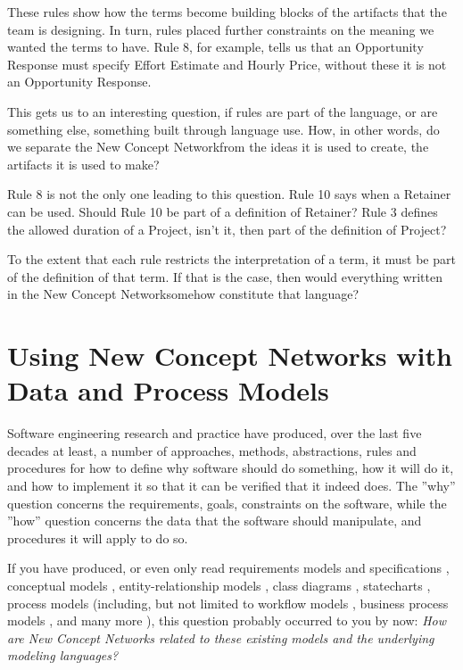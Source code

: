 \documentclass[graybox,envcountchap,sectrefs]{svmono}
\newcommand{\ncnf}{New Concept Network}
\newcommand{\nterm}[1]{\textsf{#1}}
\begin{document}
These rules show how the terms become building blocks of the artifacts that the team is designing. In turn, rules placed further constraints on the meaning we wanted the terms to have. Rule 8, for example, tells us that an \nterm{Opportunity Response} must specify \nterm{Effort Estimate} and \nterm{Hourly Price}, without these it is not an \nterm{Opportunity Response}. 

This gets us to an interesting question, if rules are part of the language, or are something else, something built through language use. How, in other words, do we separate the \ncnf from the ideas it is used to create, the artifacts it is used to make?

Rule 8 is not the only one leading to this question. Rule 10 says when a \nterm{Retainer} can be used. Should Rule 10 be part of a definition of \nterm{Retainer}? Rule 3 defines the allowed duration of a \nterm{Project}, isn't it, then part of the definition of \nterm{Project}?

To the extent that each rule restricts the interpretation of a term, it must be part of the definition of that term. If that is the case, then would everything written in the \ncnf somehow constitute that language? 

\section{Using \ncnf s with Data and Process Models}
Software engineering research and practice have produced, over the last five decades at least, a number of approaches, methods, abstractions, rules and procedures for how to define why software should do something, how it will do it, and how to implement it so that it can be verified that it indeed does. The ''why'' question concerns the requirements, goals, constraints on the software, while the ''how'' question concerns the data that the software should manipulate, and procedures it will apply to do so.

If you have produced, or even only read requirements models and specifications \cite{}, conceptual models \cite{}, entity-relationship models \cite{}, class diagrams \cite{}, statecharts \cite{}, process models (including, but not limited to workflow models \cite{}, business process models \cite{}, and many more \cite{}), this question probably occurred to you by now: \textit{How are \ncnf s related to these existing models and the underlying modeling languages?}
\end{document}
